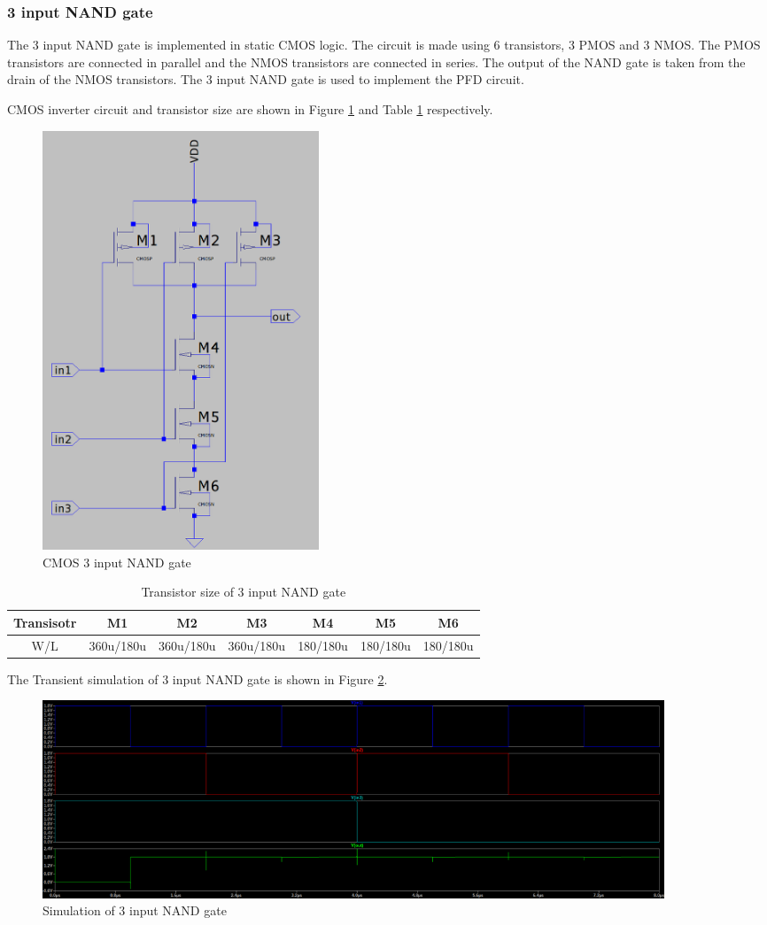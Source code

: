 \subsubsection{3 input NAND gate}
The 3 input NAND gate is implemented in static CMOS logic. The circuit is made using 6 transistors, 3 PMOS and 3 NMOS. The PMOS transistors are connected in parallel and the NMOS transistors are connected in series. The output of the NAND gate is taken from the drain of the NMOS transistors. The 3 input NAND gate is used to implement the PFD circuit.

CMOS inverter circuit and transistor size are shown in Figure \ref{fig:3nand_circuit} and Table \ref{tab:3nand_size} respectively.
\begin{figure}[H]
	\centering
	\includegraphics[width=0.4\textwidth]{figs/3nand_circuit.png}
	\caption{CMOS 3 input NAND gate}
	\label{fig:3nand_circuit}
	\vspace{0.5cm}
\end{figure}
\begin{table}[H]
\centering
\begin{tabular}{|c|c|c|c|c|c|c|}
\hline
Transisotr & M1 & M2 & M3 & M4 & M5 & M6  \\
\hline
W/L & 360u/180u & 360u/180u & 360u/180u & 180/180u & 180/180u & 180/180u \\
\hline
\end{tabular}
\caption{Transistor size of 3 input NAND gate}
\label{tab:3nand_size}
\vspace{0.5cm}
\end{table}
The Transient simulation of 3 input NAND gate is shown in Figure \ref{fig:3nand_output}.
\begin{figure}[H]
	\centering
	\includegraphics[width=0.9\textwidth]{figs/nand3op.png}
	\caption{Simulation of 3 input NAND gate}
	\label{fig:3nand_output}
	\vspace{0.5cm}
\end{figure}
